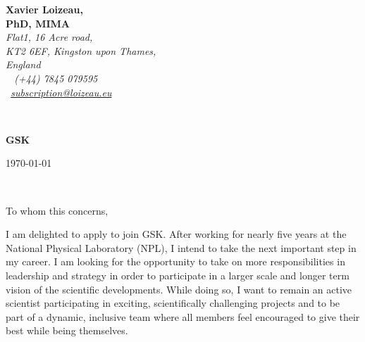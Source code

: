 \documentclass[12pt]{article}
\begin{document}
\sffamily   %
\hfill%
\begin{minipage}[t]{.6\textwidth}
\raggedleft%
{\bfseries Xavier Loizeau, \\ PhD, MIMA}\\[.35ex]
\small\itshape%
Flat1, 16 Acre road,\\
KT2 6EF, Kingston upon Thames,\\
England\\[.35ex]
\faMobile~ (+44) 7845 079595\\
\faAt~\href{mailto:subscription@loizeau.eu}{subscription@loizeau.eu}
\end{minipage}\\[1em]
%
\begin{minipage}[t]{.4\textwidth}
\raggedright%
{\bfseries GSK}\\
\end{minipage}
\hfill %
\begin{minipage}[t]{.4\textwidth}
\raggedleft %
\today
\end{minipage}\\
\raggedright

To whom this concerns,

I am delighted to apply to join GSK.
After working for nearly five years at the National Physical Laboratory (NPL), I intend to take the next important step in my career.
I am looking for the opportunity to take on more responsibilities in leadership and strategy in order to participate in a larger scale and longer term vision of the scientific developments.
While doing so, I want to remain an active scientist participating in exciting, scientifically challenging projects and to be part of a dynamic, inclusive team where all members feel encouraged to give their best while being themselves.

\medskip
\end{document}
